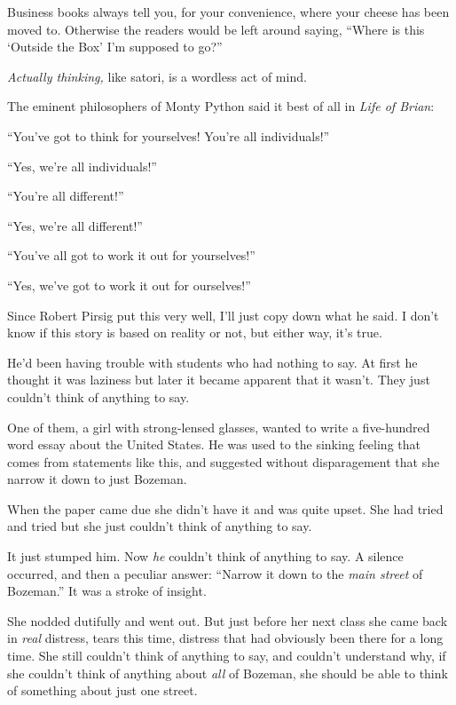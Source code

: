 {
 Business books always tell you, for your convenience, where your
cheese has been moved to. Otherwise the readers would be left around
saying, ``Where is this `Outside the
Box' I'm supposed to
go?''}

{
 \textit{Actually thinking,} like satori, is a wordless act of
mind.}

{
 The eminent philosophers of Monty Python said it best of all in
\textit{Life of Brian}:}

{
 ``You've got to think for
yourselves! You're all
individuals!''}

{
 ``Yes, we're all
individuals!''}

{
 ``You're all
different!''}

{
 ``Yes, we're all
different!''}

{
 ``You've all got to work it out
for yourselves!''}

{
 ``Yes, we've got to work it out
for ourselves!''}

\myendsectiontext


\bigskip


{
 Since Robert Pirsig put this very well, I'll just
copy down what he said. I don't know if this story is
based on reality or not, but either way, it's
true.}

{
 He'd been having trouble with students who had
nothing to say. At first he thought it was laziness but later it became
apparent that it wasn't. They just
couldn't think of anything to say.}

{
 One of them, a girl with strong-lensed glasses, wanted to write a
five-hundred word essay about the United States. He was used to the
sinking feeling that comes from statements like this, and suggested
without disparagement that she narrow it down to just Bozeman.}

{
 When the paper came due she didn't have it and was
quite upset. She had tried and tried but she just
couldn't think of anything to say.}

{
 It just stumped him. Now \textit{he} couldn't
think of anything to say. A silence occurred, and then a peculiar
answer: ``Narrow it down to the \textit{main street}
of Bozeman.'' It was a stroke of insight.}

{
 She nodded dutifully and went out. But just before her next class
she came back in \textit{real} distress, tears this time, distress that
had obviously been there for a long time. She still
couldn't think of anything to say, and
couldn't understand why, if she
couldn't think of anything about \textit{all} of
Bozeman, she should be able to think of something about just one
street.}

